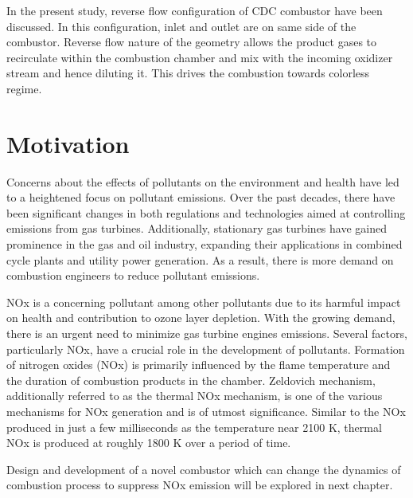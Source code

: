 In the present study, reverse flow configuration of CDC combustor have been discussed. In this configuration, inlet and outlet are on same side of the combustor. Reverse flow nature of the geometry allows the product gases to recirculate within the combustion chamber and mix with the incoming oxidizer stream and hence diluting it. This drives the combustion towards colorless regime.

\section{Motivation}
Concerns about the effects of pollutants on the environment and health have led to a heightened focus on pollutant emissions. Over the past decades, there have been significant changes in both regulations and technologies aimed at controlling emissions from gas turbines. Additionally, stationary gas turbines have gained prominence in the gas and oil industry, expanding their applications in combined cycle plants and utility power generation. As a result, there is more demand on combustion engineers to reduce pollutant emissions\cite{Lefebvre2009}.

NOx is a concerning pollutant among other pollutants due to its harmful impact on health and contribution to ozone layer depletion. With the growing demand, there is an urgent need to minimize gas turbine engines emissions. Several factors, particularly NOx, have a crucial role in the development of pollutants. Formation of nitrogen oxides (NOx) is primarily influenced by the flame temperature and the duration of combustion products in the chamber. Zeldovich mechanism\cite{LTY2013}, additionally referred to as the thermal NOx mechanism, is one of the various mechanisms for NOx generation and is of utmost significance\cite{LAH2010}. Similar to the NOx produced in just a few milliseconds as the temperature near 2100 K\cite{10.1115/1.4043437}, thermal NOx is produced at roughly 1800 K over a period of time.

Design and development of a novel combustor which can change the dynamics of combustion process to suppress NOx emission will be explored in next chapter.

